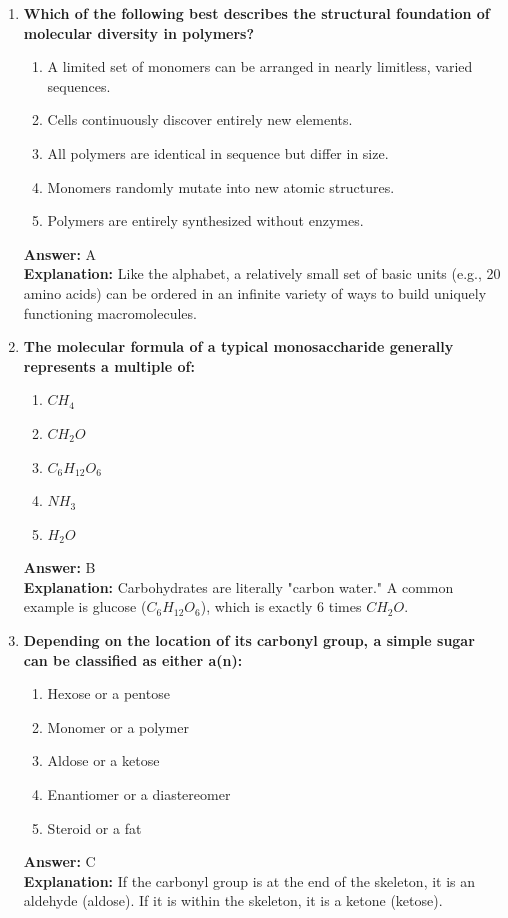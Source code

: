 \documentclass[11pt, a4paper]{article}
\begin{document}
\begin{enumerate}
\item \textbf{Which of the following best describes the structural foundation of molecular diversity in polymers?}
\begin{enumerate}[label=\Alph*.]
    \item A limited set of monomers can be arranged in nearly limitless, varied sequences.
    \item Cells continuously discover entirely new elements.
    \item All polymers are identical in sequence but differ in size.
    \item Monomers randomly mutate into new atomic structures.
    \item Polymers are entirely synthesized without enzymes.
\end{enumerate}
\textbf{Answer:} A \\
\textbf{Explanation:} Like the alphabet, a relatively small set of basic units (e.g., 20 amino acids) can be ordered in an infinite variety of ways to build uniquely functioning macromolecules.


\item \textbf{The molecular formula of a typical monosaccharide generally represents a multiple of:}
\begin{enumerate}[label=\Alph*.]
    \item $CH_4$
    \item $CH_2O$
    \item $C_6H_{12}O_6$
    \item $NH_3$
    \item $H_2O$
\end{enumerate}
\textbf{Answer:} B \\
\textbf{Explanation:} Carbohydrates are literally "carbon water." A common example is glucose ($C_6H_{12}O_6$), which is exactly 6 times $CH_2O$.

\item \textbf{Depending on the location of its carbonyl group, a simple sugar can be classified as either a(n):}
\begin{enumerate}[label=\Alph*.]
    \item Hexose or a pentose
    \item Monomer or a polymer
    \item Aldose or a ketose
    \item Enantiomer or a diastereomer
    \item Steroid or a fat
\end{enumerate}
\textbf{Answer:} C \\
\textbf{Explanation:} If the carbonyl group is at the end of the skeleton, it is an aldehyde (aldose). If it is within the skeleton, it is a ketone (ketose).


\end{enumerate}
\end{document}
